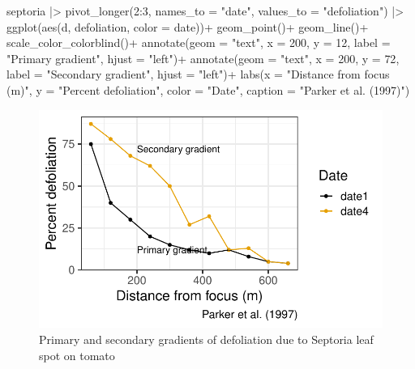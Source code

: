 \documentclass[
  letterpaper,
  DIV=11,
  numbers=noendperiod]{scrreprt}
\newenvironment{Shaded}{\begin{snugshade}}{\end{snugshade}}
\newcommand{\AttributeTok}[1]{\textcolor[rgb]{0.40,0.45,0.13}{#1}}
\newcommand{\DecValTok}[1]{\textcolor[rgb]{0.68,0.00,0.00}{#1}}
\newcommand{\FunctionTok}[1]{\textcolor[rgb]{0.28,0.35,0.67}{#1}}
\newcommand{\NormalTok}[1]{\textcolor[rgb]{0.00,0.23,0.31}{#1}}
\newcommand{\SpecialCharTok}[1]{\textcolor[rgb]{0.37,0.37,0.37}{#1}}
\newcommand{\StringTok}[1]{\textcolor[rgb]{0.13,0.47,0.30}{#1}}
\begin{document}
\begin{Shaded}
\begin{Highlighting}[]
\NormalTok{septoria }\SpecialCharTok{|\textgreater{}} 
  \FunctionTok{pivot\_longer}\NormalTok{(}\DecValTok{2}\SpecialCharTok{:}\DecValTok{3}\NormalTok{, }\AttributeTok{names\_to =} \StringTok{"date"}\NormalTok{, }
               \AttributeTok{values\_to =} \StringTok{"defoliation"}\NormalTok{) }\SpecialCharTok{|\textgreater{}} 
  \FunctionTok{ggplot}\NormalTok{(}\FunctionTok{aes}\NormalTok{(d, defoliation, }\AttributeTok{color =}\NormalTok{ date))}\SpecialCharTok{+}
  \FunctionTok{geom\_point}\NormalTok{()}\SpecialCharTok{+}
  \FunctionTok{geom\_line}\NormalTok{()}\SpecialCharTok{+}
  \FunctionTok{scale\_color\_colorblind}\NormalTok{()}\SpecialCharTok{+}
  \FunctionTok{annotate}\NormalTok{(}\AttributeTok{geom =} \StringTok{"text"}\NormalTok{, }\AttributeTok{x =} \DecValTok{200}\NormalTok{, }\AttributeTok{y =} \DecValTok{12}\NormalTok{, }
           \AttributeTok{label =} \StringTok{"Primary gradient"}\NormalTok{, }\AttributeTok{hjust =} \StringTok{"left"}\NormalTok{)}\SpecialCharTok{+}
  \FunctionTok{annotate}\NormalTok{(}\AttributeTok{geom =} \StringTok{"text"}\NormalTok{, }\AttributeTok{x =} \DecValTok{200}\NormalTok{, }\AttributeTok{y =} \DecValTok{72}\NormalTok{, }
           \AttributeTok{label =} \StringTok{"Secondary gradient"}\NormalTok{, }\AttributeTok{hjust =} \StringTok{"left"}\NormalTok{)}\SpecialCharTok{+}
  \FunctionTok{labs}\NormalTok{(}\AttributeTok{x =} \StringTok{"Distance from focus (m)"}\NormalTok{,}
       \AttributeTok{y =} \StringTok{"Percent defoliation"}\NormalTok{,}
       \AttributeTok{color =} \StringTok{"Date"}\NormalTok{,}
       \AttributeTok{caption =} \StringTok{"Parker et al. (1997)"}\NormalTok{)}
\end{Highlighting}
\end{Shaded}

\begin{figure}[H]

{\centering \includegraphics{spatial-gradients_files/figure-pdf/fig-grad3-1.pdf}

}

\caption{\label{fig-grad3}Primary and secondary gradients of defoliation
due to Septoria leaf spot on tomato}

\end{figure}
\end{document}

